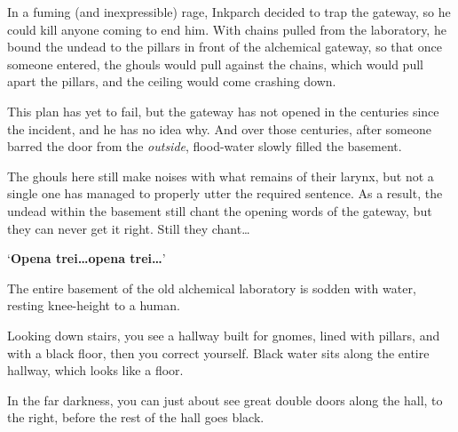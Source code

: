 \begin{exampletext}
  In a fuming (and inexpressible) rage, Inkparch decided to trap the gateway, so he could kill anyone coming to end him.
  With chains pulled from the laboratory, he bound the undead to the pillars in front of the alchemical gateway, so that once someone entered, the ghouls would pull against the chains, which would pull apart the pillars, and the ceiling would come crashing down.

  This plan has yet to fail, but the gateway has not opened in the centuries since the incident, and he has no idea why.
  And over those centuries, after someone barred the door from the \emph{outside}, flood-water slowly filled the basement.

  The ghouls here still make noises with what remains of their larynx, but not a single one has managed to properly utter the required sentence.
  As a result, the undead within the basement still chant the opening words of the gateway, but they can never get it right.
  Still they chant\ldots

  `\textbf{Opena trei\ldots opena trei\ldots}'
\end{exampletext}

The entire basement of the old alchemical laboratory is sodden with water, resting knee-height to a human.

\begin{boxtext}
  Looking down stairs, you see a hallway built for gnomes, lined with pillars, and with a black floor, then you correct yourself.
  Black water sits along the entire hallway, which looks like a floor.

  In the far darkness, you can just about see great double doors along the hall, to the right, before the rest of the hall goes black.
\end{boxtext}


